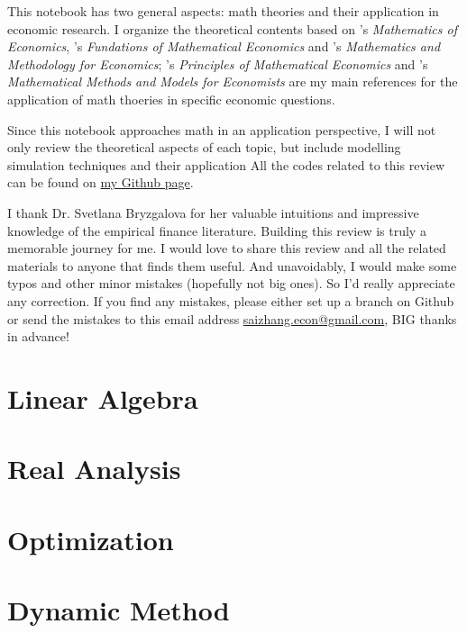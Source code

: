 \documentclass[12pt,openany]{report}
\begin{document}
This notebook has two general aspects: math theories and their application in economic research. I organize
the theoretical contents based on \citet{hoy2011mathematics}'s \textit{Mathematics of Economics}, 
\citet{carter2001foundations}'s \textit{Fundations of Mathematical Economics} and \citet{eichhornmathematics}'s 
\textit{Mathematics and Methodology for Economics}; \citet{vali2014principles}'s \textit{Principles of Mathematical Economics}
and \citet{de2000mathematical}'s \textit{Mathematical Methods and Models for Economists} are my main references
 for the application of math thoeries in specific economic questions.


Since this notebook approaches math in an application perspective, I will not only
review the theoretical aspects of each topic, but include modelling simulation techniques
and their application  All the codes related
to this review can be found on \href{https://github.com/SaiChrisZHANG}{my Github page}.

I thank Dr. Svetlana Bryzgalova for her valuable intuitions and impressive
knowledge of the empirical finance literature. Building this review is truly
a memorable journey for me. I would love to share this review and all the related
materials to anyone that finds them useful. And unavoidably, I would make some
typos and other minor mistakes (hopefully not big ones). So I'd really appreciate
any correction. If you find any mistakes, please either set up a branch on Github
or send the mistakes to this email address 
\href{mailto:saizhang.econ@gmail.com}{saizhang.econ@gmail.com}, BIG thanks in advance!

\newpage

\dominitoc
{}
\label{ToC-first-page}
\tableofcontents

\pagestyle{mystyle}
\chapter{Linear Algebra}


\chapter{Real Analysis}

\chapter{Optimization}

\chapter{Dynamic Method}

\newpage


\end{document}
